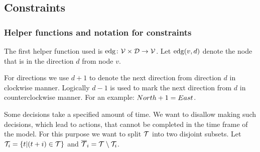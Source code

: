 \subsection{Constraints}
\subsubsection{Helper functions and notation for constraints}
\label{sec:helpers}
The first helper function used is $\mathrm{edg} \colon \mathcal{V} \times \mathcal{D} \to \mathcal{V}$. Let
$\mathrm{edg}(v,d)$ denote the node that is in the direction $d$ from node $v$.

For directions we use $d + 1$ to denote the next direction from direction $d$ in
clockwise manner. Logically $d - 1$ is used to mark the next direction from $d$
in counterclockwise manner. For an example: $North + 1 = East$.

Some decisions take a specified amount of time. We want to disallow making such
decisions, which lead to actions, that cannot be completed in the time frame of
the model. For this purpose we want to split $\mathcal{T}$ into two disjoint subsets.
Let $\mathcal{T}_i = \{ t | (t+i) \in \mathcal{T}\}$ and $\overline{\mathcal{T}}_i = \mathcal{T} \setminus \mathcal{T}_i$.
